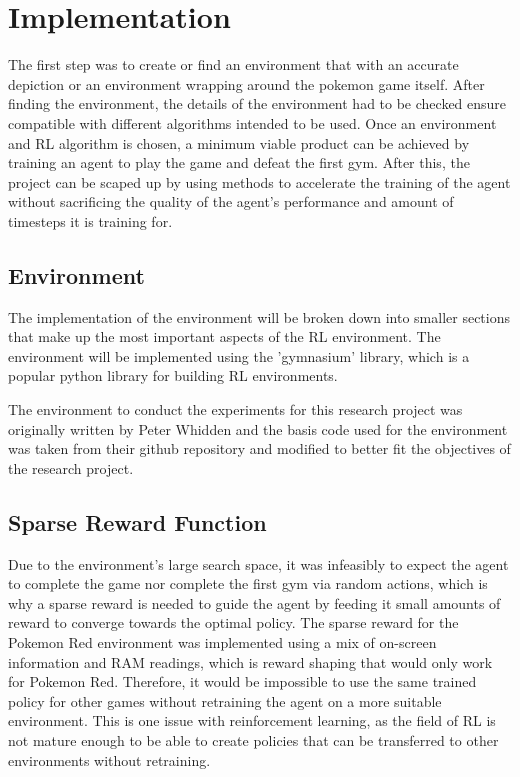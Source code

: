 \section{Implementation}

The first step was to create or find an environment that with an accurate depiction or an environment wrapping around the pokemon game itself. After finding the environment, the details of the environment had to be checked ensure compatible with different algorithms intended to be used. Once an environment and RL algorithm is chosen, a minimum viable product can be achieved by training an agent to play the game and defeat the first gym. After this,  the project can be scaped up by using methods to accelerate the training of the agent without sacrificing the quality of the agent's performance and amount of timesteps it is training for. 

\subsection{Environment}

The implementation of the environment will be broken down into smaller sections that make up the most important aspects of the RL environment. The environment will be implemented using the 'gymnasium' library, which is a popular python library for building RL environments.

The environment to conduct the experiments for this research project was originally written by Peter Whidden and the basis code used for the environment was taken from their github repository and modified to better fit the objectives of the research project. 

\subsection{Sparse Reward Function}

Due to the environment's large search space, it was infeasibly to expect the agent to complete the game nor complete the first gym via random actions, which is why a sparse reward is needed to guide the agent by feeding it small amounts of reward to converge towards the optimal policy. The sparse reward for the Pokemon Red environment was implemented using a mix of on-screen information and RAM readings, which is reward shaping that would only work for Pokemon Red. Therefore, it would be impossible to use the same trained policy for other games without retraining the agent on a more suitable environment. This is one issue with reinforcement learning, as the field of RL is not mature enough to be able to create policies that can be transferred to other environments without retraining.

